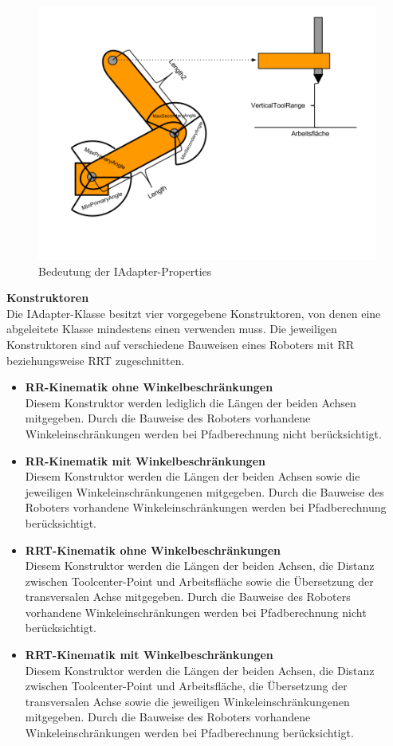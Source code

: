 \begin{figure}[H]
  \centering
  \begin{minipage}[t]{12 cm}
  	\centering
  	\includegraphics[width=12cm]{images/AdapterProperties} 
    \caption{Bedeutung der IAdapter-Properties}
  \end{minipage}
\end{figure}

\textbf{Konstruktoren}\\
Die IAdapter-Klasse besitzt vier vorgegebene Konstruktoren, von denen eine abgeleitete Klasse mindestens einen verwenden muss. Die jeweiligen Konstruktoren sind auf verschiedene Bauweisen eines Roboters mit RR beziehungsweise RRT zugeschnitten.
\begin{itemize}
\item \textbf{RR-Kinematik ohne Winkelbeschränkungen}\\
Diesem Konstruktor werden lediglich die Längen der beiden Achsen mitgegeben. Durch die Bauweise des Roboters vorhandene Winkeleinschränkungen werden bei Pfadberechnung nicht berücksichtigt.
\item \textbf{RR-Kinematik mit Winkelbeschränkungen}\\
Diesem Konstruktor werden die Längen der beiden Achsen sowie die jeweiligen Winkeleinschränkungenen mitgegeben. Durch die Bauweise des Roboters vorhandene Winkeleinschränkungen werden bei Pfadberechnung berücksichtigt.
\item \textbf{RRT-Kinematik ohne Winkelbeschränkungen}\\
Diesem Konstruktor werden die Längen der beiden Achsen, die Distanz zwischen Toolcenter-Point und Arbeitsfläche sowie die Übersetzung der transversalen Achse mitgegeben. Durch die Bauweise des Roboters vorhandene Winkeleinschränkungen werden bei Pfadberechnung nicht berücksichtigt.
\item \textbf{RRT-Kinematik mit Winkelbeschränkungen}\\
Diesem Konstruktor werden die Längen der beiden Achsen, die Distanz zwischen Toolcenter-Point und Arbeitsfläche, die Übersetzung der transversalen Achse sowie die jeweiligen Winkeleinschränkungenen mitgegeben. Durch die Bauweise des Roboters vorhandene Winkeleinschränkungen werden bei Pfadberechnung berücksichtigt.
\end{itemize}


